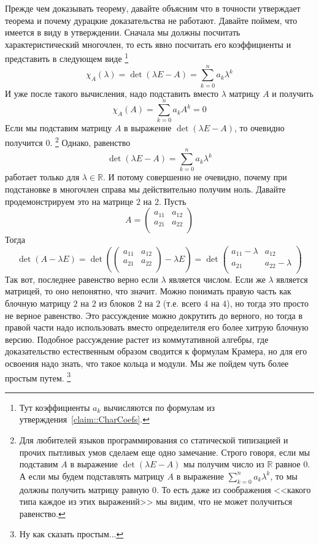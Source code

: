 Прежде чем доказывать теорему, давайте объясним что в точности утверждает теорема и почему дурацкие доказательства не работают.
Давайте поймем, что имеется в виду в утверждении.
Сначала мы должны посчитать характеристический многочлен, то есть явно посчитать его коэффициенты и представить в следующем виде%
\footnote{Тут коэффициенты $a_k$ вычисляются по формулам из утверждения~\ref{claim::CharCoefs}.}
\[
\chi_A(\lambda ) = \det(\lambda E - A) = \sum_{k=0}^n a_k \lambda ^k
\]
И уже после такого вычисления, надо подставить вместо $\lambda$ матрицу $A$ и получить
\[
\chi_A(A) = \sum_{k=0}^n a_k A^k = 0
\]
Если мы подставим матрицу $A$ в выражение $\det(\lambda E - A)$, то очевидно получится $0$.%
\footnote{Для любителей языков программирования со статической типизацией и прочих пытливых умов сделаем еще одно замечание.
Строго говоря, если мы подставим $A$ в выражение $\det(\lambda E - A)$ мы получим число из $\mathbb R$ равное $0$.
А если мы будем подставлять матрицу $A$ в выражение $\sum_{k=0}^n a_k \lambda ^k$, то мы должны получить матрицу равную $0$.
То есть даже из соображения <<какого типа каждое из этих выражений>> мы видим, что не может получиться равенство.}
Однако, равенство
\[
\det(\lambda E - A) = \sum_{k=0}^n a_k \lambda ^k
\]
работает только для $\lambda \in \mathbb R$.
И потому совершенно не очевидно, почему при подстановке в многочлен справа мы действительно получим ноль.
Давайте продемонстрируем это на матрице $2$ на $2$.
Пусть
\[
A = 
\begin{pmatrix}
{a_{11}}&{a_{12}}\\
{a_{21}}&{a_{22}}\\
\end{pmatrix}
\]
Тогда
\[
\det(A-\lambda E) =
\det
\left(
\begin{pmatrix}
{a_{11}}&{a_{12}}\\
{a_{21}}&{a_{22}}\\
\end{pmatrix}
-\lambda E
\right)=
\det 
\begin{pmatrix}
{a_{11}-\lambda}&{a_{12}}\\
{a_{21}}&{a_{22}-\lambda}\\
\end{pmatrix}
\]
Так вот, последнее равенство верно если $\lambda$ является числом.
Если же $\lambda$ является матрицей, то оно непонятно, что значит.
Можно понимать правую часть как блочную матрицу $2$ на $2$ из блоков $2$ на $2$ (т.е. всего $4$ на $4$), но тогда это просто не верное равенство.
Это рассуждение можно докрутить до верного, но тогда в правой части надо использовать вместо определителя его более хитрую блочную версию.
Подобное рассуждение растет из коммутативной алгебры, где доказательство естественным образом сводится к формулам Крамера, но для его освоения надо знать, что такое кольца и модули.
Мы же пойдем чуть более простым путем.%
\footnote{Ну как сказать простым...}

